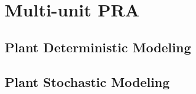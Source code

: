 \section{Multi-unit PRA}
\label{sec:multiUnitPRA}

\subsection{Plant Deterministic Modeling}

\subsection{Plant Stochastic Modeling}